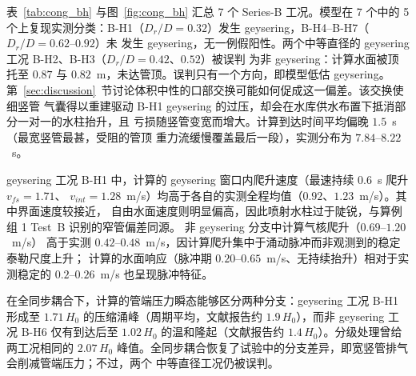\documentclass[preprint,12pt]{elsarticle}
\begin{document}
表~\ref{tab:cong_bh} 与图~\ref{fig:cong_bh} 汇总 7 个 Series-B 工况。模型在 7 个中的
5 个上复现实测分类：B-H1（$D_r/D=0.32$）发生 geysering，B-H4--B-H7（$D_r/D=0.62$--$0.92$）未
发生 geysering，无一例假阳性。两个中等直径的 geysering 工况 B-H2、B-H3（$D_r/D=0.42$、$0.52$）被误判
为非 geysering：计算水面被顶托至 $0.87$ 与 $0.82$~m，未达管顶。误判只有一个方向，即模型低估
geysering。第~\ref{sec:discussion}~节讨论体积中性的口部交换可能如何促成这一偏差。该交换使细竖管
气囊得以重建驱动 B-H1 geysering 的过压，却会在水库供水布置下抵消部分一对一的水柱抬升，且
亏损随竖管变宽而增大。计算到达时间平均偏晚 $1.5$~s（最宽竖管最甚，受阻的管顶
重力流缓慢覆盖最后一段），实测分布为 $7.84$--$8.22$~s。

geysering 工况 B-H1 中，计算的 geysering 窗口内爬升速度（最速持续 $0.6$~s 爬升 $v_{fs}=1.71$、
$v_{int}=1.28$~m/s）均高于各自的实测全程均值（$0.92$、$1.23$~m/s）。其中界面速度较接近，
自由水面速度则明显偏高，因此喷射水柱过于陡锐，与算例组 1 Test~B 识别的窄管偏差同源。
非 geysering 分支中计算气核爬升（$0.69$--$1.20$~m/s）
高于实测 $0.42$--$0.48$~m/s，因计算爬升集中于涌动脉冲而非观测到的稳定泰勒尺度上升；
计算的水面响应（脉冲期 $0.20$--$0.65$~m/s、无持续抬升）相对于实测稳定的
$0.2$--$0.26$~m/s 也呈现脉冲特征。

在全同步耦合下，计算的管端压力瞬态能够区分两种分支：geysering 工况 B-H1 形成至 $1.71\,H_0$
的压缩涌峰（周期平均，文献报告约 $1.9\,H_0$），而非 geysering 工况 B-H6 仅有到达后至
$1.02\,H_0$ 的温和隆起（文献报告约 $1.4\,H_0$）。分级处理曾给两工况相同的 $2.07\,H_0$
峰值。全同步耦合恢复了试验中的分支差异，即宽竖管排气会削减管端压力；不过，两个
中等直径工况仍被误判。
\end{document}
